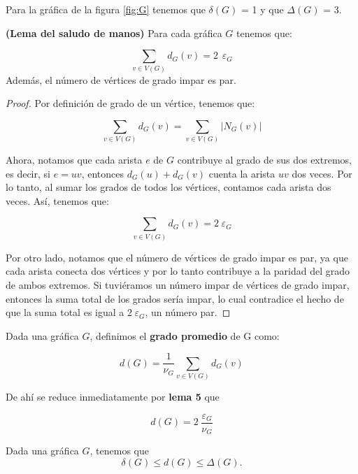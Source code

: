     \noindent Para la gráfica de la figura \ref{fig:G} tenemos que $\delta(G)$ = 1 y que $\Delta(G)$ = 3.




\begin{lemma}
    \textbf{(Lema del saludo de manos)}
    Para cada gráfica $G$ tenemos que:
 
        \[
\sum_{v \in V(G)}d_G (v) = 2 \hspace{5pt}\varepsilon_G
\]
Además, el número de vértices de grado impar es par.
   
\end{lemma}
\begin{proof}
    \noindent Por definición de grado de un vértice, tenemos que:
    
    \[\sum_{v \in V(G)}d_G (v) = \sum_{v \in V(G)}|N_G(v)|\]
    
    \noindent Ahora, notamos que cada arista $e$ de $G$ contribuye al grado de sus dos extremos, es decir, si $e = uv$, entonces $d_G(u) + d_G(v)$ cuenta la arista $uv$ dos veces. Por lo tanto, al sumar los grados de todos los vértices, contamos cada arista dos veces. Así, tenemos que:
    
    \[\sum_{v \in V(G)}d_G (v) = 2\hspace{3pt}\varepsilon_G\]
    
    \noindent Por otro lado, notamos que el número de vértices de grado impar es par, ya que cada arista conecta dos vértices y por lo tanto contribuye a la paridad del grado de ambos extremos. Si tuviéramos un número impar de vértices de grado impar, entonces la suma total de los grados sería impar, lo cual contradice el hecho de que la suma total es igual a $2\hspace{3pt}\varepsilon_G$, un número par.
\end{proof}

\begin{definition}
    Dada una gráfica $G$, definimos el \textbf{grado promedio} de G como:
    
         \[d(G) = \frac{1}{\nu_G}\sum_{v\in V(G)}d_G (v)\]
\end{definition}

    
    De ahí se reduce inmediatamente por \textbf{lema 5} que 
    
         \[d(G) = 2\hspace{3pt}\frac{\varepsilon_G}{\nu_G} \]



\begin{proposition}
Dada una gráfica $G$, tenemos que
\[\delta(G) \leq d(G) \leq \Delta(G).\]
    
\end{proposition}

